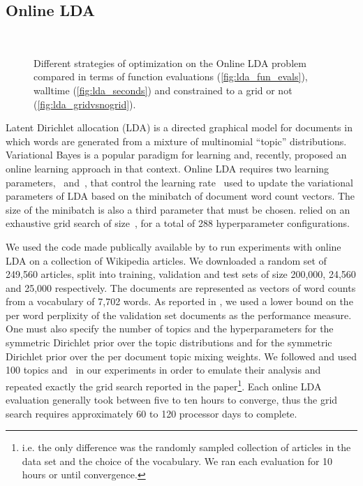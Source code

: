 \documentclass[aos,preprint]{imsart}
\begin{document}
\subsection{Online LDA}
\begin{figure}[ht]
\begin{center}
\\
\end{center}
\caption{Different strategies of optimization on the Online LDA
  problem compared in terms of function evaluations
  (\ref{fig:lda_fun_evals}), walltime (\ref{fig:lda_seconds}) and
  constrained to a grid or not (\ref{fig:lda_gridvsnogrid}).}
\end{figure}

Latent Dirichlet allocation (LDA) is a directed graphical model for
documents in which words are generated from a mixture of multinomial
``topic'' distributions. Variational Bayes is a popular paradigm for
learning and, recently, \citet{Hoffman2010} proposed an online
learning approach in that context. Online LDA requires two learning
parameters,~ and~, that control the learning
rate~ used to update the
variational parameters of LDA based on the  minibatch of
document word count vectors. The size of the minibatch is also a third
parameter that must be chosen. \citet{Hoffman2010} relied on an
exhaustive grid search of size~, for a total of 288
hyperparameter configurations.

We used the code made publically available by \citet{Hoffman2010} to
run experiments with online LDA on a collection of Wikipedia
articles. We downloaded a random set of 249,560 articles, split into
training, validation and test sets of size 200,000, 24,560 and 25,000
respectively. The documents are represented as vectors of word counts
from a vocabulary of 7,702 words. As reported in \citet{Hoffman2010},
we used a lower bound on the per word perplixity of the validation set
documents as the performance measure. One must also specify the number
of topics and the hyperparameters  for the symmetric Dirichlet
prior over the topic distributions and  for the symmetric
Dirichlet prior over the per document topic mixing weights. We
followed \citet{Hoffman2010} and used 100 topics and~ in our experiments in order to emulate their analysis and
repeated exactly the grid search reported in the
paper\footnote{i.e. the only difference was the randomly sampled
  collection of articles in the data set and the choice of the
  vocabulary. We ran each evaluation for 10 hours or until
  convergence.}. Each online LDA evaluation generally took between
five to ten hours to converge, thus the grid search requires
approximately 60 to 120 processor days to complete.
\end{document}
